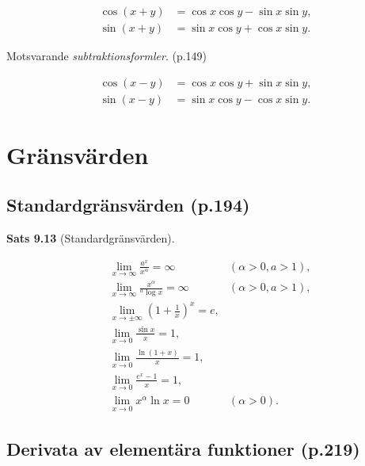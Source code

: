\documentclass[11pt]{article}
\begin{document}
\begin{align}
    \cos(x + y) &= \cos x \cos y - \sin x \sin y,\\
    \sin(x + y) &= \sin x \cos y + \cos x \sin y.
\end{align}

Motsvarande \textit{subtraktionsformler}. (p.149)

\begin{align}
    \cos(x - y) &= \cos x \cos y + \sin x \sin y,\\
    \sin(x - y) &= \sin x \cos y - \cos x \sin y.
\end{align}

\newpage
\section{Gränsvärden}

\subsection{Standardgränsvärden (p.194)}

\textbf{Sats 9.13} (Standardgränsvärden).

\begin{align}
    &\lim_{x \to \infty} \frac{a^x}{x^\alpha} = \infty \quad &(\alpha > 0, a > 1),\\
    &\lim_{x \to \infty} \frac{x^\alpha}{{}^a\log x} = \infty \quad &(\alpha > 0, a > 1),\\
    &\lim_{x \to \pm \infty} \left( 1 + \frac{1}{x} \right)^x = e,\\
    &\lim_{x \to 0} \frac{\sin x}{x} = 1,\\
    &\lim_{x \to 0} \frac{\ln(1 + x)}{x} = 1,\\
    &\lim_{x \to 0} \frac{e^x - 1}{x} = 1,\\
    &\lim_{x \to 0} x^\alpha \ln x = 0 \quad &(\alpha > 0).
\end{align}

\newpage
\subsection{Derivata av elementära funktioner (p.219)}
\end{document}
